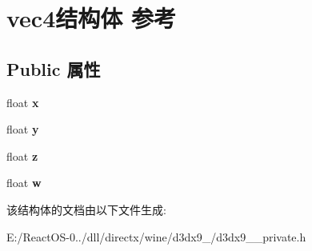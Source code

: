 \hypertarget{structvec4}{}\section{vec4结构体 参考}
\label{structvec4}
\subsection*{Public 属性}
\begin{DoxyCompactItemize}
\item 
\mbox{\label{structvec4_a36c650782a67137380c83b01545c94d6}} 
float {\bfseries x}
\item 
\mbox{\label{structvec4_a7328fe0e502fce92fa32016193052e92}} 
float {\bfseries y}
\item 
\mbox{\label{structvec4_a12b318751110db034dddc450cdec455d}} 
float {\bfseries z}
\item 
\mbox{\label{structvec4_a0c92fe67e490d9768217a00c2e8abd49}} 
float {\bfseries w}
\end{DoxyCompactItemize}


该结构体的文档由以下文件生成\+:\begin{DoxyCompactItemize}
\item 
E\+:/\+React\+O\+S-\/0../dll/directx/wine/d3dx9\+\_/d3dx9\+\_\+\_\+private.\+h\end{DoxyCompactItemize}
